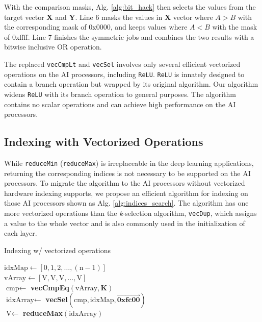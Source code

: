 \documentclass[12pt]{extbook}
\begin{document}
With the comparison masks, Alg. \ref{alg:bit_hack} then selects the values from the target vector \textbf{X} and \textbf{Y}. Line 6 masks the values in \textbf{X} vector where $A > B$ with the corresponding mask of 0x0000, and keeps values where $A < B$ with the mask of 0xffff. Line 7 finishes the symmetric jobs and combines the two results with a bitwise inclusive OR operation.

The replaced \verb|vecCmpLt| and \verb|vecSel| involves only several efficient vectorized operations on the AI processors, including \verb|ReLU|. \verb|ReLU| is innately designed to contain a branch operation but wrapped by its original algorithm. Our algorithm widens \verb|ReLU| with its branch operation to general purposes. The algorithm contains no scalar operations and can achieve high performance on the AI processors.

\subsection{Indexing with Vectorized Operations}

While \verb|reduceMin| (\verb|reduceMax|) is irreplaceable in the deep learning applications, returning the corresponding indices is not necessary to be supported on the AI processors. To migrate the algorithm to the AI processors without vectorized hardware indexing supports, we propose an efficient algorithm for indexing on those AI processors shown as Alg. \ref{alg:indices_search}. The algorithm has one more vectorized operations than the \textit{k}-selection algorithm, \verb|vecDup|, which assigns a value to the whole vector and is also commonly used in the initialization of each layer.

\begin{algorithm}[tbp]
    \caption{Indexing w/ vectorized operations}
    \label{alg:indices_search}
        
        
            
    \BlankLine
    
    $\text{idxMap} \leftarrow [0, 1, 2, \dots, (\text{n}-1)]$ \\
    $\text{vArray} \leftarrow [\text{V}, \text{V}, \text{V}, \dots, \text{V}]$ \\
    $\text{cmp} \leftarrow $ \textbf{vecCmpEq}$(\text{vArray}, \textbf{K})$  \\
    $\text{idxArray} \leftarrow $ \textbf{vecSel}$(\text{cmp}, \text{idxMap}, \vec{\textbf{0xfc00}})$ \\
    $\text{V} \leftarrow$ \textbf{reduceMax}$(\text{idxArray})$ \\
\end{algorithm}
\end{document}
